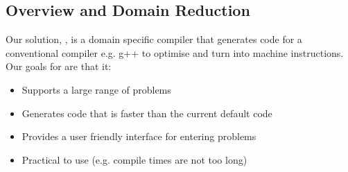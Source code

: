 \newcommand{\vecc}[1]{\vec{\mathbf{#1}}}

\subsection{Overview and Domain Reduction}
Our solution, \phlat, is a domain specific compiler that generates code for a conventional compiler e.g. g++ to optimise and turn into machine instructions.
Our goals for \phlat are that it:
\begin{itemize}
    \item Supports a large range of problems
    \item Generates code that is faster than the current default code
    \item Provides a user friendly interface for entering problems
    \item Practical to use (e.g. compile times are not too long)
\end{itemize}

